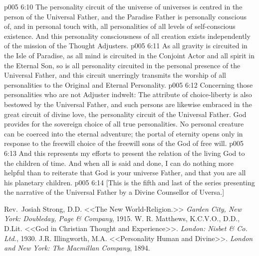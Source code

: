 \vs p005 6:10 \pc The personality circuit of the universe of universes is centred in the person of the Universal Father, and the Paradise Father is personally conscious of, and in personal touch with, all personalities of all levels of self\hyp{}conscious existence. And this personality consciousness of all creation exists independently of the mission of the Thought Adjusters.
\vs p005 6:11 \pc As all gravity is circuited in the Isle of Paradise, as all mind is circuited in the Conjoint Actor and all spirit in the Eternal Son, so is all personality circuited in the personal presence of the Universal Father, and this circuit unerringly transmits the worship of all personalities to the Original and Eternal Personality.
\vs p005 6:12 \pc Concerning those personalities who are not Adjuster indwelt: The attribute of choice\hyp{}liberty is also bestowed by the Universal Father, and such persons are likewise embraced in the great circuit of divine love, the personality circuit of the Universal Father. God provides for the sovereign choice of all true personalities. No personal creature can be coerced into the eternal adventure; the portal of eternity opens only in response to the freewill choice of the freewill sons of the God of free will.
\vs p005 6:13 \pc And this represents my efforts to present the relation of the living God to the children of time. And when all is said and done, I can do nothing more helpful than to reiterate that God is your universe Father, and that you are all his planetary children.
\vsetoff
\vs p005 6:14 [This is the fifth and last of the series presenting the narrative of the Universal Father by a Divine Counsellor of Uversa.]
\quizlink
\begin{thebibliography}{100}
Rev.~Josiah Strong, D.D.
{<<The New World\hyp{}Religion.>>}
{\em Garden City, New York: Doubleday, Page \& Company}, 1915.
W. R. Matthews, K.C.V.O., D.D., D.Lit.
{<<God in Christian Thought and Experience>>.}
{\em London: Nisbet \& Co. Ltd.}, 1930.
J.R. Illingworth, M.A.
{<<Personality Human and Divine>>.}
{\em London and New York: The Macmillan Company}, 1894.
\end{thebibliography}
